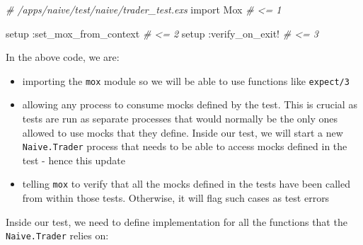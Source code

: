 \documentclass[
  oneside]{book}
\newenvironment{Shaded}{\begin{snugshade}}{\end{snugshade}}
\newcommand{\CommentTok}[1]{\textcolor[rgb]{0.56,0.35,0.01}{\textit{#1}}}
\newcommand{\ConstantTok}[1]{\textcolor[rgb]{0.56,0.35,0.01}{#1}}
\newcommand{\ImportTok}[1]{#1}
\newcommand{\NormalTok}[1]{#1}
\newcommand{\VariableTok}[1]{\textcolor[rgb]{0.00,0.00,0.00}{#1}}
\providecommand{\tightlist}{%
  \setlength{\itemsep}{0pt}\setlength{\parskip}{0pt}}
\begin{document}
\begin{Shaded}
\begin{Highlighting}[]
\CommentTok{\# /apps/naive/test/naive/trader\_test.exs}
  \ImportTok{import} \ConstantTok{Mox}                   \CommentTok{\# \textless{}= 1 }

\NormalTok{  setup }\VariableTok{:set\_mox\_from\_context}  \CommentTok{\# \textless{}= 2}
\NormalTok{  setup }\VariableTok{:verify\_on\_exit!}       \CommentTok{\# \textless{}= 3}
\end{Highlighting}
\end{Shaded}

\newpage

In the above code, we are:

\begin{itemize}
\tightlist
\item
  importing the \texttt{mox} module so we will be able to use functions like \texttt{expect/3}
\item
  allowing any process to consume mocks defined by the test. This is crucial as tests are run as separate processes that would normally be the only ones allowed to use mocks that they define. Inside our test, we will start a new \texttt{Naive.Trader} process that needs to be able to access mocks defined in the test - hence this update
\item
  telling \texttt{mox} to verify that all the mocks defined in the tests have been called from within those tests. Otherwise, it will flag such cases as test errors
\end{itemize}

Inside our test, we need to define implementation for all the functions that the \texttt{Naive.Trader} relies on:
\end{document}
